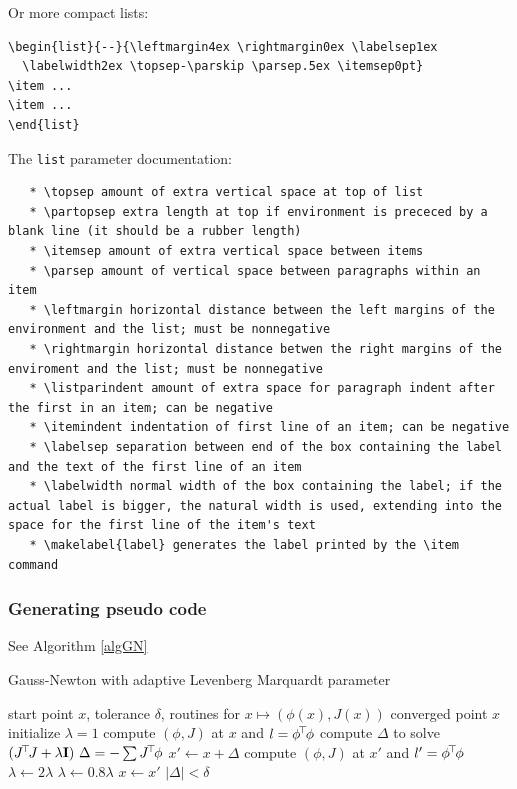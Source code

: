 Or more compact lists:\\
\begin{code}
\begin{verbatim}
\begin{list}{--}{\leftmargin4ex \rightmargin0ex \labelsep1ex
  \labelwidth2ex \topsep-\parskip \parsep.5ex \itemsep0pt}
\item ...
\item ...
\end{list}
\end{verbatim}
\end{code}

The \verb+list+ parameter documentation:\\
\begin{code}
\begin{verbatim}
   * \topsep amount of extra vertical space at top of list
   * \partopsep extra length at top if environment is prececed by a blank line (it should be a rubber length)
   * \itemsep amount of extra vertical space between items
   * \parsep amount of vertical space between paragraphs within an item
   * \leftmargin horizontal distance between the left margins of the environment and the list; must be nonnegative
   * \rightmargin horizontal distance betwen the right margins of the enviroment and the list; must be nonnegative
   * \listparindent amount of extra space for paragraph indent after the first in an item; can be negative
   * \itemindent indentation of first line of an item; can be negative
   * \labelsep separation between end of the box containing the label and the text of the first line of an item
   * \labelwidth normal width of the box containing the label; if the actual label is bigger, the natural width is used, extending into the space for the first line of the item's text
   * \makelabel{label} generates the label printed by the \item command
\end{verbatim}
\end{code}

\subsubsection{Generating pseudo code}

See Algorithm \ref{algGN}

\begin{algorithm}[ht]
\caption{Gauss-Newton with adaptive Levenberg Marquardt parameter}
\label{algGN}
\begin{algorithmic}[1]\small
\REQUIRE start point $x$, tolerance $\delta$, routines for $x \mapsto
  (\phi(x), J(x))$
\ENSURE converged point $x$
\STATE initialize $\lambda=1$
\STATE compute $(\phi, J)$ at $x$ and $l=\phi^{\!\top\!} \phi$
\REPEAT
\STATE\label{redo} compute $\Delta$ to solve $(J^{\!\top\!} J +\lambda {\rm\bf I})~ \Delta = - \sum
J^{\!\top\!} \phi$
\STATE $x' \gets x + \Delta$
\STATE compute $(\phi, J)$ at $x'$ and $l'=\phi^{\!\top\!} \phi$
\STATE $\lambda \gets 2\lambda$
\ELSE
\STATE $\lambda \gets 0.8\lambda$
\STATE $x \gets x'$
\ENDIF
\UNTIL $|\Delta| < \delta$
\end{algorithmic}
\end{algorithm}


